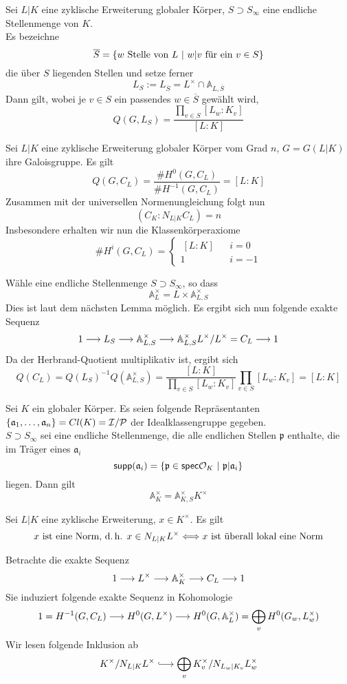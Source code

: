 \documentclass{book}
\renewcommand{\A}{\mathbb{A}}
\renewcommand{\i}{^{-1}}
\newcommand{\af}{\mathfrak{a}}
\newcommand{\pf}{\mathfrak{p}}
\begin{document}
\Satz{}
Sei $L|K$ eine zyklische Erweiterung globaler Körper, $S \supset S_\infty$ eine endliche Stellenmenge von $K$.\\
Es bezeichne 
\[\overline{S} = \set{w \text{ Stelle von }L}{w|v \text{ für ein } v \in S} \]
die über $S$ liegenden Stellen und setze ferner
\[ L_S := L_{\overline{S}} = L^\times \cap \A_{L,\overline{S}} \]
Dann gilt, wobei je $v \in S$ ein passendes $w\in \overline{S}$ gewählt wird,
\[ Q(G,L_S) = \frac{\prod_{v\in S} [L_w : K_v]}{[L:K]} \]

\Satz{}
Sei $L|K$ eine zyklische Erweiterung globaler Körper vom Grad $n$, $G = G(L|K)$ ihre Galoisgruppe. Es gilt
\[ Q(G, C_L) = \frac{\# H^0(G,C_L)}{\# H\i(G,C_L)} = [L:K]  \]
Zusammen mit der universellen Normenungleichung  folgt nun
\[ (C_K : N_{L|K} C_L ) = n \]
Insbesondere erhalten wir nun die Klassenkörperaxiome
\[ \# H^i(G,C_L) = \left\lbrace
\begin{aligned}
\ [L:K] && i = 0\\
1 && i = -1
\end{aligned}
\right. \]

\begin{Beweis}{}
Wähle eine endliche Stellenmenge $S \supset S_\infty$, so dass
\[ \A_L^\times = L\times \A_{L,S}^\times \]
Dies ist laut dem nächsten Lemma möglich. Es ergibt sich nun folgende exakte Sequenz
\[ 1 \Pfeil{} L_S \Pfeil{} \A_{L,S}^\times \Pfeil{} \A_{L,S}^\times L^\times /L^\times = C_L \Pfeil{} 1 \]
Da der Herbrand-Quotient multiplikativ ist, ergibt sich
\[ Q(C_L) = Q(L_S)\i Q(\A_{L,S}^\times) = \frac{[L:K]}{\prod_{v\in S} [L_w : K_v]} \prod_{v\in S} [L_w : K_v] = [L:K] \]
\end{Beweis}

\Lem{}
Sei $K$ ein globaler Körper. Es seien folgende Repräsentanten $\{\af_1,\ldots , \af_n \} = Cl(K) = \I / \P$ der Idealklassengruppe gegeben.\\
$S \supset S_\infty$ sei eine endliche Stellenmenge, die alle endlichen Stellen $\pf$ enthalte, die im Träger eines $\af_i$
\[ \textsf{supp}(\af_i) = \set{\pf \in \textsf{spec}\O_K}{\pf | \af_i} \]
liegen. Dann gilt
\[ \A_K^\times = \A_{K,S}^\times K^\times \]

Sei $L|K$ eine zyklische Erweiterung, $x \in K^\times$. Es gilt
\[ x \text{ ist eine Norm, d.\,h. } x \in N_{L|K}L^\times \overset{}{\Longleftrightarrow} x \text{ ist überall lokal eine Norm} \]
\begin{Beweis}{}
Betrachte die exakte Sequenz
\[ 1 \Pfeil{} L^\times \Pfeil{} \A_K^\times \Pfeil{} C_L \Pfeil{} 1 \]
Sie induziert folgende exakte Sequenz in Kohomologie
\[ 1 = H\i(G,C_L) \Pfeil{} H^0(G,L^\times) \Pfeil{} H^0(G,\A_L^\times) = \bigoplus_v H^0(G_w, L_w^\times) \]
Wir lesen folgende Inklusion ab
\[ K^\times / N_{L|K}L^\times \Inj{} \bigoplus_v K_v^\times / N_{L_w|K_v}L_w^\times \]
\end{Beweis}
\end{document}
